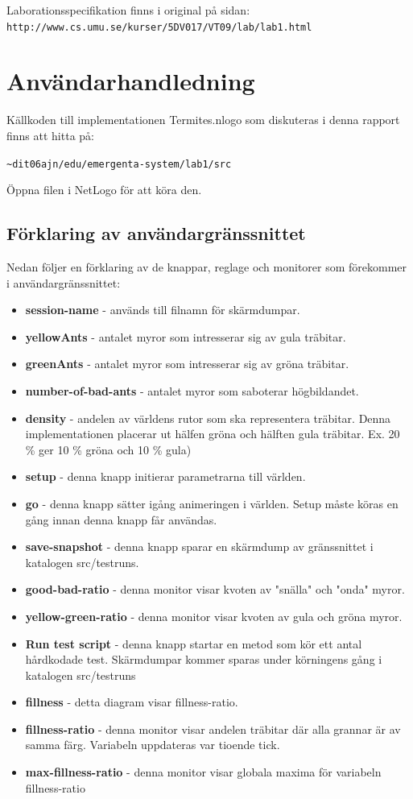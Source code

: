 \documentclass[titlepage, a4paper, 12pt]{article}
\begin{document}
Laborationsspecifikation finns i original på sidan:\\
\verb!http://www.cs.umu.se/kurser/5DV017/VT09/lab/lab1.html!

\section{Användarhandledning}
Källkoden till implementationen Termites.nlogo som diskuteras i denna
rapport finns att hitta på:

\verb!~dit06ajn/edu/emergenta-system/lab1/src!

Öppna filen i NetLogo för att köra den.

\subsection{Förklaring av användargränssnittet}
Nedan följer en förklaring av de knappar, reglage och monitorer som
förekommer i användargränssnittet:

\begin{itemize}
\item \textbf{session-name} - används till filnamn för skärmdumpar.
\item \textbf{yellowAnts} - antalet myror som intresserar sig av gula träbitar.
\item \textbf{greenAnts} - antalet myror som intresserar sig av gröna träbitar.
\item \textbf{number-of-bad-ants} - antalet myror som saboterar högbildandet.
\item \textbf{density} - andelen av världens rutor som ska
  representera träbitar. Denna implementationen placerar ut hälfen gröna
  och hälften gula träbitar. Ex. 20 \% ger 10 \% gröna och 10 \% gula)
\item \textbf{setup} - denna knapp initierar parametrarna till världen.
\item \textbf{go} - denna knapp sätter igång animeringen i
  världen. Setup måste köras en gång innan denna knapp får användas.
\item \textbf{save-snapshot} - denna knapp sparar en skärmdump av
  gränssnittet i katalogen src/testruns.
\item \textbf{good-bad-ratio} - denna monitor visar kvoten av "snälla"
  och "onda" myror.
\item \textbf{yellow-green-ratio} - denna monitor visar kvoten av gula
  och gröna myror.
\item \textbf{Run test script} - denna knapp startar en metod som kör
  ett antal hårdkodade test. Skärmdumpar kommer sparas under
  körningens gång i katalogen src/testruns
\item \textbf{fillness} - detta diagram visar fillness-ratio.
\item \textbf{fillness-ratio} - denna monitor visar andelen träbitar där
  alla grannar är av samma färg. Variabeln uppdateras var tioende
  tick.
\item \textbf{max-fillness-ratio} - denna monitor visar globala maxima
  för variabeln fillness-ratio
\end{itemize}
\end{document}
